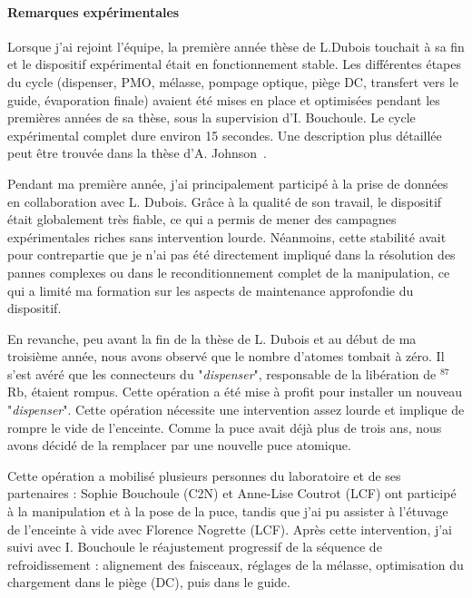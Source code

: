 \paragraph{Remarques expérimentales}
Lorsque j’ai rejoint l’équipe, la première année thèse de L.Dubois touchait à sa fin et le dispositif expérimental était en fonctionnement stable. Les différentes étapes du cycle (dispenser, \gls{PMO}, mélasse, pompage optique, piège \gls{DC}, transfert vers le guide, évaporation finale) avaient été mises en place et optimisées pendant les premières années de sa thèse, sous la supervision d’I. Bouchoule. Le cycle expérimental complet dure environ 15 secondes. Une description plus détaillée peut être trouvée dans la thèse d’A. Johnson~\cite{Johnson2016}.

\medskip

Pendant ma première année, j’ai principalement participé à la prise de données en collaboration avec L. Dubois. Grâce à la qualité de son travail, le dispositif était globalement très fiable, ce qui a permis de mener des campagnes expérimentales riches sans intervention lourde. Néanmoins, cette stabilité avait pour contrepartie que je n’ai pas été directement impliqué dans la résolution des pannes complexes ou dans le reconditionnement complet de la manipulation, ce qui a limité ma formation sur les aspects de maintenance approfondie du dispositif.

\medskip


En revanche, peu avant la fin de la thèse de L. Dubois et au début de ma troisième année, nous avons observé que le nombre d’atomes tombait à zéro. Il s’est avéré que les connecteurs du "\emph{dispenser}", responsable de la libération de $^{87}$Rb, étaient rompus. Cette opération a été mise à profit pour installer un nouveau "\emph{dispenser}". Cette opération nécessite une intervention assez lourde et implique de rompre le vide de l’enceinte. Comme la puce avait déjà plus de trois ans, nous avons décidé de la remplacer par une nouvelle puce atomique.

\medskip

Cette opération a mobilisé plusieurs personnes du laboratoire et de ses partenaires : Sophie Bouchoule (\gls{C2N}) et  Anne-Lise Coutrot (\gls{LCF}) ont participé à la manipulation et à la pose de la puce, tandis que j’ai pu assister à l’étuvage de l’enceinte à vide avec Florence Nogrette (\gls{LCF}). Après cette intervention, j’ai suivi avec I. Bouchoule le réajustement progressif de la séquence de refroidissement : alignement des faisceaux, réglages de la mélasse, optimisation du chargement dans le piège (\gls{DC}), puis dans le guide.

